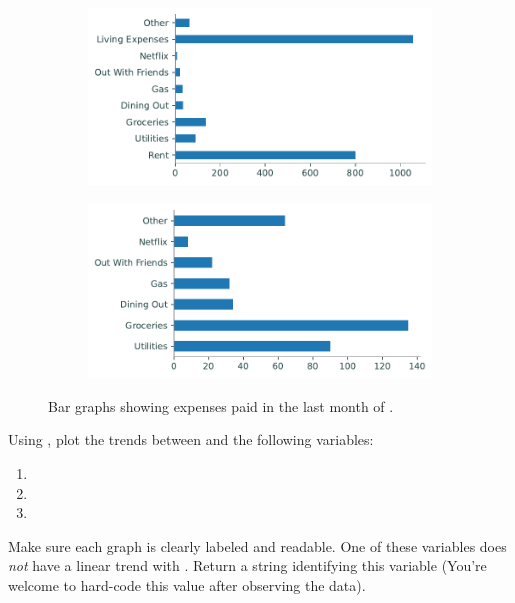 \begin{figure}[H] %
\captionsetup[subfigure]{justification=centering}
\centering
\begin{subfigure}{.49\textwidth}
    \includegraphics[width=\textwidth]{figures/all_expenses.pdf}
\end{subfigure}
%
\begin{subfigure}{.49\textwidth}
    \includegraphics[width=\textwidth]{figures/some_expenses.pdf}
\end{subfigure}
\caption{Bar graphs showing expenses paid in the last month of .}
\end{figure}

\begin{problem}
Using , plot the trends between  and the following variables:
\begin{enumerate}
\item {}
\item {}
\item {}
\end{enumerate}
Make sure each graph is clearly labeled and readable.
One of these variables does \emph{not} have a linear trend with .
Return a string identifying this variable (You're welcome to hard-code this value after observing the data).
\end{problem}


